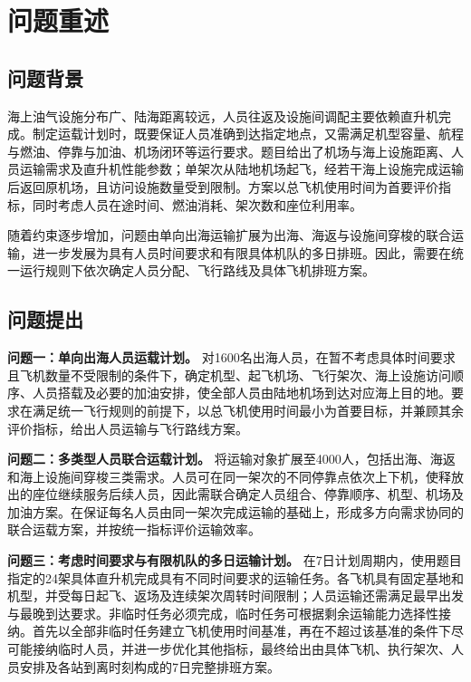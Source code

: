 
\section{问题重述}\label{sec:problem-restatement}

\subsection{问题背景}\label{subsec:problem-background}

海上油气设施分布广、陆海距离较远，人员往返及设施间调配主要依赖直升机完成。制定运载计划时，既要保证人员准确到达指定地点，又需满足机型容量、航程与燃油、停靠与加油、机场闭环等运行要求。题目给出了机场与海上设施距离、人员运输需求及直升机性能参数；单架次从陆地机场起飞，经若干海上设施完成运输后返回原机场，且访问设施数量受到限制。方案以总飞机使用时间为首要评价指标，同时考虑人员在途时间、燃油消耗、架次数和座位利用率。

随着约束逐步增加，问题由单向出海运输扩展为出海、海返与设施间穿梭的联合运输，进一步发展为具有人员时间要求和有限具体机队的多日排班。因此，需要在统一运行规则下依次确定人员分配、飞行路线及具体飞机排班方案。

\subsection{问题提出}\label{subsec:problem-statement}

\textbf{问题一：单向出海人员运载计划。}
对1600名出海人员，在暂不考虑具体时间要求且飞机数量不受限制的条件下，确定机型、起飞机场、飞行架次、海上设施访问顺序、人员搭载及必要的加油安排，使全部人员由陆地机场到达对应海上目的地。要求在满足统一飞行规则的前提下，以总飞机使用时间最小为首要目标，并兼顾其余评价指标，给出人员运输与飞行路线方案。

\textbf{问题二：多类型人员联合运载计划。}
将运输对象扩展至4000人，包括出海、海返和海上设施间穿梭三类需求。人员可在同一架次的不同停靠点依次上下机，使释放出的座位继续服务后续人员，因此需联合确定人员组合、停靠顺序、机型、机场及加油方案。在保证每名人员由同一架次完成运输的基础上，形成多方向需求协同的联合运载方案，并按统一指标评价运输效率。

\textbf{问题三：考虑时间要求与有限机队的多日运输计划。}
在7日计划周期内，使用题目指定的24架具体直升机完成具有不同时间要求的运输任务。各飞机具有固定基地和机型，并受每日起飞、返场及连续架次周转时间限制；人员运输还需满足最早出发与最晚到达要求。非临时任务必须完成，临时任务可根据剩余运输能力选择性接纳。首先以全部非临时任务建立飞机使用时间基准，再在不超过该基准的条件下尽可能接纳临时人员，并进一步优化其他指标，最终给出由具体飞机、执行架次、人员安排及各站到离时刻构成的7日完整排班方案。
